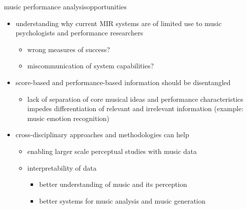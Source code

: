         \begin{frame}{music performance analysis}{opportunities}
            \begin{itemize}
                \item   understanding why current MIR systems are of limited use to music psychologists and performance researchers
                    \begin{itemize}
                        \item   wrong measures of success?
                        \item   miscommunication of system capabilities?
                    \end{itemize}
                \bigskip
                \item   score-based and performance-based information should be disentangled
                    \begin{itemize}
                        \item   lack of separation of core musical ideas and performance characteristics impedes differentiation of relevant and irrelevant information (example: music emotion recognition)
                    \end{itemize}
                \bigskip
                \item   cross-disciplinary approaches and methodologies can help
                    \begin{itemize}
                        \item   enabling larger scale perceptual studies with music data
                        \item   interpretability of data 
                            \begin{itemize}
                                \item   better understanding of music and its perception 
                                \item   better systems for music analysis and music generation
                            \end{itemize}
                    \end{itemize}
            \end{itemize}

        \end{frame}
    
